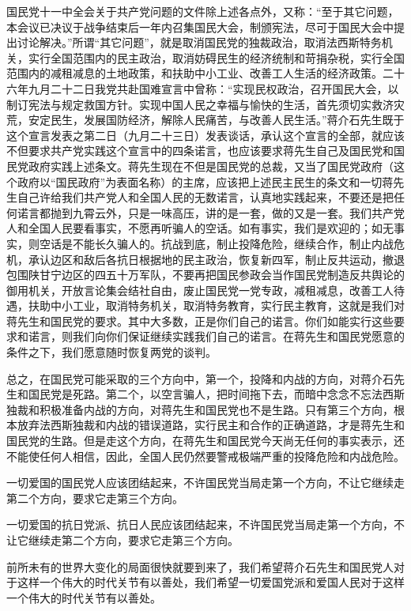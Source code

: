 国民党十一中全会关于共产党问题的文件除上述各点外，又称：“至于其它问题，本会议已决议于战争结束后一年内召集国民大会，制颁宪法，尽可于国民大会中提出讨论解决。”所谓“其它问题”，就是取消国民党的独裁政治，取消法西斯特务机关，实行全国范围内的民主政治，取消妨碍民生的经济统制和苛捐杂税，实行全国范围内的减租减息的土地政策，和扶助中小工业、改善工人生活的经济政策。二十六年九月二十二日我党共赴国难宣言中曾称：“实现民权政治，召开国民大会，以制订宪法与规定救国方针。实现中国人民之幸福与愉快的生活，首先须切实救济灾荒，安定民生，发展国防经济，解除人民痛苦，与改善人民生活。”蒋介石先生既于这个宣言发表之第二日（九月二十三日）发表谈话，承认这个宣言的全部，就应该不但要求共产党实践这个宣言中的四条诺言，也应该要求蒋先生自己及国民党和国民党政府实践上述条文。蒋先生现在不但是国民党的总裁，又当了国民党政府（这个政府以“国民政府”为表面名称）的主席，应该把上述民主民生的条文和一切蒋先生自己许给我们共产党人和全国人民的无数诺言，认真地实践起来，不要还是把任何诺言都抛到九霄云外，只是一味高压，讲的是一套，做的又是一套。我们共产党人和全国人民要看事实，不愿再听骗人的空话。如有事实，我们是欢迎的；如无事实，则空话是不能长久骗人的。抗战到底，制止投降危险，继续合作，制止内战危机，承认边区和敌后各抗日根据地的民主政治，恢复新四军，制止反共运动，撤退包围陕甘宁边区的四五十万军队，不要再把国民参政会当作国民党制造反共舆论的御用机关，开放言论集会结社自由，废止国民党一党专政，减租减息，改善工人待遇，扶助中小工业，取消特务机关，取消特务教育，实行民主教育，这就是我们对蒋先生和国民党的要求。其中大多数，正是你们自己的诺言。你们如能实行这些要求和诺言，则我们向你们保证继续实践我们自己的诺言。在蒋先生和国民党愿意的条件之下，我们愿意随时恢复两党的谈判。

总之，在国民党可能采取的三个方向中，第一个，投降和内战的方向，对蒋介石先生和国民党是死路。第二个，以空言骗人，把时间拖下去，而暗中念念不忘法西斯独裁和积极准备内战的方向，对蒋先生和国民党也不是生路。只有第三个方向，根本放弃法西斯独裁和内战的错误道路，实行民主和合作的正确道路，才是蒋先生和国民党的生路。但是走这个方向，在蒋先生和国民党今天尚无任何的事实表示，还不能使任何人相信，因此，全国人民仍然要警戒极端严重的投降危险和内战危险。

一切爱国的国民党人应该团结起来，不许国民党当局走第一个方向，不让它继续走第二个方向，要求它走第三个方向。

一切爱国的抗日党派、抗日人民应该团结起来，不许国民党当局走第一个方向，不让它继续走第二个方向，要求它走第三个方向。

前所未有的世界大变化的局面很快就要到来了，我们希望蒋介石先生和国民党人对于这样一个伟大的时代关节有以善处，我们希望一切爱国党派和爱国人民对于这样一个伟大的时代关节有以善处。


